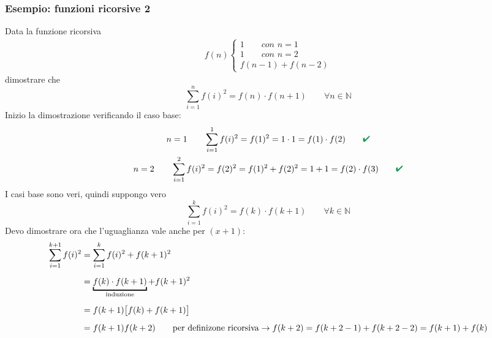 \documentclass[italian]{article}
\newcommand{\N}{\text{$\mathbb{N}$}}
\renewcommand{\checkmark}{\textcolor{ForestGreen}{\text{$\qquad$\ding{52}}}}
\begin{document}
\subsubsection{Esempio: funzioni ricorsive 2}
Data la funzione ricorsiva
\begin{gather*}
	f(n)
	\begin{cases*}
		1 \qquad \textit{con } n=1 \\
		1 \qquad \textit{con } n=2 \\
		f(n-1)+f(n-2)
	\end{cases*}
\end{gather*}
dimostrare che 
\[
	\sum_{i=1}^{n}f(i)^2 = f(n)\cdot f(n+1) \qquad \forall n \in \N
\]
Inizio la dimostrazione verificando il caso base:
\begin{gather*}
	n=1 \qquad \sum_{i=1}^{1}f(i)^2 = f(1)^2 = 1\cdot 1 = f(1)\cdot f(2) \checkmark \\
	n=2 \qquad \sum_{i=1}^{2}f(i)^2 = f(2)^2 = f(1)^2 + f(2)^2 = 1 + 1 = f(2)\cdot f(3) \checkmark
\end{gather*}
I casi base sono veri, quindi suppongo vero
\[
	\sum_{i=1}^{k}f(i)^2 = f(k)\cdot f(k+1) \qquad \forall k \in \N
\]
Devo dimostrare ora che l'uguaglianza vale anche per $(x+1)$:
\begin{gather*}
	\begin{split}
		\sum_{i=1}^{k+1}f(i)^2 &= \sum_{i=1}^{k}f(i)^2 + f(k+1)^2 \\[2mm]
		&= \underbracket{f(k)\cdot f(k+1)}_{\mathclap{\text{induzione}}} + f(k+1)^2 \\[2mm]
		&= f(k+1)\big[ f(k) + f(k+1) \big] \\[2mm]
		&= f(k+1)f(k+2) \qquad \text{per definizone ricorsiva}\to  f(k+2)= f(k + 2 - 1)+f(k+2-2) = f(k+1) + f(k)
	\end{split}\\[2mm]	
\end{gather*}










\pagebreak
\end{document}
